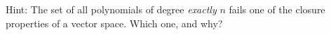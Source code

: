 %
Hint:  The set of all polynomials of degree {\em exactly} $n$ fails one of the closure properties of a vector space.  Which one, and why?